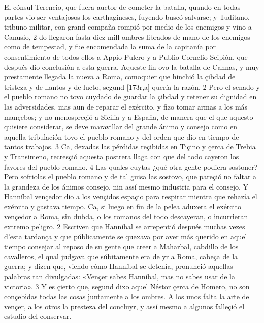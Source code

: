 \documentclass[11pt,twoside]{article}\makeatletter
\def\persName{}\def\name{}
\def\placeName{}
\begin{document}
\pend
{} El cónsul Terencio, que fuera auctor de cometer la batalla, quando en todas partes vio ser ventajosos los  {\name carthagineses}, fuyendo buscó salvarse; y Tuditano, tribuno militar, con grand compaña rompió por medio de los enemigos y vino a Canusio, 2 do llegaron fasta diez mill ombres librados de mano de los enemigos como de tempestad, y fue encomendada la suma de la capitanía por consentimiento de todos ellos a Appio Pulcro y a Publio Cornelio Scipión, que después dio conclusión a esta guerra.
\pend
{} Aqueste fin ovo la batalla de Cannas, y muy prestamente llegada la nueva a Roma, comoquier que hinchió la çibdad de tristeza y de llantos y de lucto, segund %
[173r,a] quería la razón. 2 Pero el senado y el pueblo romano no  tovo cuydado de guardar la çibdad y retener su dignidad en las adversidades, mas aun de reparar el exército, y fizo tomar armas a los más mançebos; y no menospreçió a  {\placeName Sicilia} y a  {\placeName España}, de manera que el que aquesto quisiere considerar, se deve maravillar del grande ánimo y consejo como en aquella tribulación tovo el pueblo romano y del orden que dio en tiempo de tantos trabajos. 3 Ca, dexadas las pérdidas reçibidas en Tiçino y çerca de Trebia y  Transimeno, recresçió aquesta postrera llaga con que del todo cayeron los favores del pueblo romano. 4 Las quales cuytas ¿qué otra gente podiera sostoner? Pero sofriolas el pueblo romano y de tal guisa las sostovo, que pareçió no faltar a la grandeza de los ánimos consejo, nin assí mesmo industria para el consejo.
\pend
{} Y  {\persName Hanníbal} vençedor dio a los vençidos espaçio para respirar mientra que rehazía el exército y gastava tiempo. Ca, si luego en fin de la pelea aduxera el exército vençedor a Roma, sin dubda, o los romanos del todo descayeran, o incurrieran extremo peligro. 2 Escriven que  {\persName Hanníbal} se arrepentió después muchas vezes d’esta tardança y que públicamente se quexava por aver más querido en aquel tiempo consejar al reposo de su gente que creer a Maharbal, cabdillo de los cavalleros, el qual judgava que súbitamente era de yr a Roma, cabeça de la guerra; y dizen que, viendo cómo  {\persName Hanníbal} se detenía, pronunció aquellas palabras tan divulgadas: «Vençer sabes  {\persName Hanníbal}, mas no sabes usar de la victoria». 3 Y es çierto que, segund dixo aquel Néstor çerca de Homero, no son conçebidas todas las cosas juntamente a los ombres. A los unos falta la arte del vençer, a los otros la presteza del concluyr, y assí mesmo a algunos falleçió el estudio del conservar. %
\end{document}
